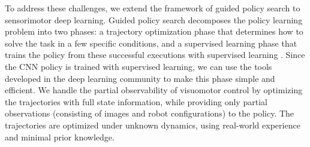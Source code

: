 \documentclass[conference]{IEEEtran}
\begin{document}

To address these challenges, we extend the framework of guided policy search to sensorimotor deep learning. Guided policy search decomposes the policy learning problem into two phases: a trajectory optimization phase that determines how to solve the task in a few specific conditions, and a supervised learning phase that trains the policy from these successful executions with supervised learning \cite{lk-lcnnp-14}. Since the CNN policy is trained with supervised learning, we can use the tools developed in the deep learning community to make this phase simple and efficient. We handle the partial observability of visuomotor control by optimizing the trajectories with full state information, while providing only partial observations (consisting of images and robot configurations) to the policy. The trajectories are optimized under unknown dynamics, using real-world experience and minimal prior knowledge.

\end{document}
